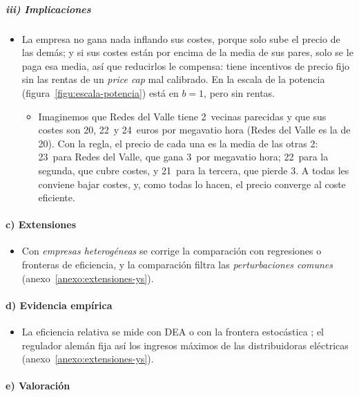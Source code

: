 \documentclass[11pt]{article}
\begin{document}
\subparagraph{iii) Implicaciones}

\begin{itemize}
\item La empresa no gana nada inflando sus costes, porque solo sube el precio de las demás; y si sus costes están por encima de la media de sus pares, solo se le paga esa media, así que reducirlos le compensa: tiene incentivos de precio fijo sin las rentas de un \emph{price cap} mal calibrado. En la escala de la potencia (figura~\ref{figu:escala-potencia}) está en $b=1$, pero sin rentas.
  \begin{itemize}
  \item Imaginemos que Redes del Valle tiene 2~vecinas parecidas y que sus costes son 20, 22~y 24~euros por megavatio hora (Redes del Valle es la de 20). Con la regla, el precio de cada una es la media de las otras 2: 23~para Redes del Valle, que gana 3~por megavatio hora; 22~para la segunda, que cubre costes, y 21~para la tercera, que pierde 3. A todas les conviene bajar costes, y, como todas lo hacen, el precio converge al coste eficiente.
  \end{itemize}
\end{itemize}

\paragraph{c) Extensiones}

\begin{itemize}
\item Con \emph{empresas heterogéneas} se corrige la comparación con regresiones o fronteras de eficiencia, y la comparación filtra las \emph{perturbaciones comunes} (anexo~\ref{anexo:extensiones-ys}).
\end{itemize}

\paragraph{d) Evidencia empírica}

\begin{itemize}
\item La eficiencia relativa se mide con DEA o con la frontera estocástica  ; el regulador alemán fija así los ingresos máximos de las distribuidoras eléctricas\nocite{BNetzA2026Effizienzvergleich} (anexo~\ref{anexo:extensiones-ys}).
\end{itemize}

\paragraph{e) Valoración}
\end{document}
